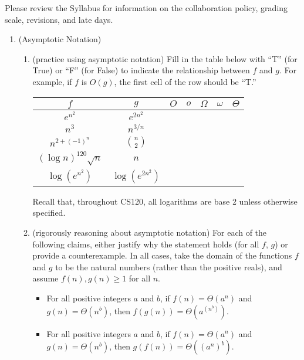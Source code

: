 \documentclass[11pt]{article}
\begin{document}

Please review the Syllabus for information on the collaboration policy, grading scale, revisions, and late days.


\begin{enumerate}
    \item (Asymptotic Notation) 
    \begin{enumerate}
    \item (practice using asymptotic notation)
        Fill in the table below with ``T'' (for True) or ``F'' (for False) to indicate the relationship between $f$ and $g$. For example, if $f$ is $O(g)$, the first cell of the row should be ``T.'' \\
        \begin{table}[h!]
        \centering
        \bgroup
        \def\arraystretch{1.3}
        \begin{tabular}{||c | c || c | c | c | c | c ||}
         \hline
         $f$ & $g$ & $O$ & $o$ & $\Omega$ & $\omega$ & $\Theta$ \\
         \hline\hline
         $e^{n^2}$ & $e^{2n^2}$ & & & & & \\ \hline
         $n^3$ & $n^{3/n}$ & & & & & \\ \hline
         $n^{2+(-1)^n}$ & $\binom{n}{2}$ & & & & & \\ \hline
         $(\log {n})^{120}\sqrt{n}$ & $n$ & & & & & \\ \hline
         $\log(e^{n^2})$ & $\log(e^{2n^2})$ & & & & & \\ \hline
        \end{tabular}
        \egroup
        \end{table}
        Recall that, throughout CS120, all logarithms are base 2 unless otherwise specified. 
        
    \item  (rigorously reasoning about asymptotic notation)  
    For each of the following claims, either justify why the statement holds (for all $f$, $g$) or provide a counterexample. In all cases, take the domain of the functions $f$ and $g$ to be the natural numbers (rather than the positive reals), and assume $f(n), g(n)\geq 1$ for all $n$.
    \begin{itemize}
        \item For all positive integers $a$ and $b$, if $f(n) = \Theta(a^n)$ and $g(n) = \Theta(n^b)$, then $f(g(n)) = \Theta(a^{(n^b)})$.
        \item For all positive integers $a$ and $b$, if $f(n) = \Theta(a^n)$ and $g(n) = \Theta(n^b)$, then $g(f(n)) = \Theta((a^n)^b)$.
    \end{itemize}
  

\end{enumerate}
\end{enumerate}
\end{document}
